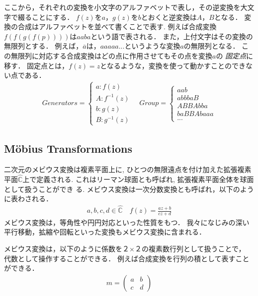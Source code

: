 ここから，それぞれの変換を小文字のアルファベットで表し，その逆変換を大文字で綴ることにする．
$f(z)$を$a$，$g(z)$を$b$とおくと逆変換は$A$，$B$となる．
変換の合成はアルファベットを並べて書くことで表す.
例えば合成変換$f(f(g(f(p))))$は$aaba$という語で表される．
また，上付文字はその変換の無限列とする．
例えば，$\overline{a}$は，$aaaaa...$というような変換$a$の無限列となる．
この無限列に対応する合成変換はどの点に作用させてもその点を変換$a$の
\emph{固定点}に移す．
固定点とは，$f(z) = z$となるような，変換を使って動かすことのできない点である．
 \begin{align*}
  Generators =
   \begin{cases}
    a \colon f(z) \\
    A \colon f^{-1}(z) \\
    b \colon g(z) \\
    B \colon g^{-1}(z)
   \end{cases}
  \quad
  Group =
   \begin{cases}
    aab\\
    abbbaB \\
    ABBAbba \\
    baBBAbaaa \\
    ...
   \end{cases}
 \end{align*}

\subsection{M\"obius Transformations}

二次元のメビウス変換は複素平面上に, ひとつの無限遠点を付け加えた拡張複素
平面$\hat{\mathbb{C}}$上で定義される.
これはリーマン球面とも呼ばれ, 拡張複素平面全体を球面として扱うことができ
る.
メビウス変換は一次分数変換とも呼ばれ，以下のように表わされる．
\begin{align*}
 a, b, c, d\in \hat{\mathbb{C}} \quad f(z) = \frac{az + b}{cz + d}
\end{align*}
メビウス変換は，等角性や円円対応といった性質をもつ．
我々になじみの深い平行移動，拡縮や回転といった変換もメビウス変換に含まれる．

メビウス変換は，以下のように係数を２×２の複素数行列として扱うことで，
代数として操作することができる．
例えば合成変換を行列の積として表すことができる．
\begin{align*}
  m = \left(
 \begin{array}{ccc}
  a & b \\
  c & d
 \end{array}
 \right)
\end{align*}

